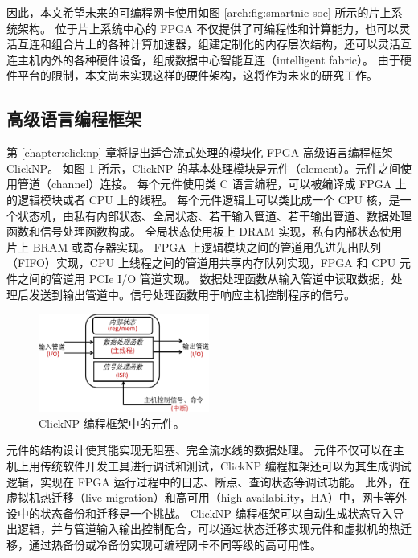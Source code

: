因此，本文希望未来的可编程网卡使用如图 \ref{arch:fig:smartnic-soc} 所示的片上系统架构。
位于片上系统中心的 FPGA 不仅提供了可编程性和计算能力，也可以灵活互连和组合片上的各种计算加速器，组建定制化的内存层次结构，还可以灵活互连主机内外的各种硬件设备，组成数据中心智能互连（intelligent fabric）。
由于硬件平台的限制，本文尚未实现这样的硬件架构，这将作为未来的研究工作。



\subsection{高级语言编程框架}

第 \ref{chapter:clicknp} 章将提出适合流式处理的模块化 FPGA 高级语言编程框架 ClickNP。
如图 \ref{arch:fig:element_arch} 所示，ClickNP 的基本处理模块是元件（element）。元件之间使用管道（channel）连接。
每个元件使用类 C 语言编程，可以被编译成 FPGA 上的逻辑模块或者 CPU 上的线程。
每个元件逻辑上可以类比成一个 CPU 核，是一个状态机，由私有内部状态、全局状态、若干输入管道、若干输出管道、数据处理函数和信号处理函数构成。
全局状态使用板上 DRAM 实现，私有内部状态使用片上 BRAM 或寄存器实现。
FPGA 上逻辑模块之间的管道用先进先出队列（FIFO）实现，CPU 上线程之间的管道用共享内存队列实现，FPGA 和 CPU 元件之间的管道用 PCIe I/O 管道实现。
数据处理函数从输入管道中读取数据，处理后发送到输出管道中。信号处理函数用于响应主机控制程序的信号。

\begin{figure}[htbp]
	\centering
	\includegraphics[width=0.5\textwidth]{chapters/clicknp/image/element_arch.pdf}
	\caption{ClickNP 编程框架中的元件。}
	\label{arch:fig:element_arch}
\end{figure}

元件的结构设计使其能实现无阻塞、完全流水线的数据处理。
元件不仅可以在主机上用传统软件开发工具进行调试和测试，ClickNP 编程框架还可以为其生成调试逻辑，实现在 FPGA 运行过程中的日志、断点、查询状态等调试功能。
此外，在虚拟机热迁移（live migration）和高可用（high availability，HA）中，网卡等外设中的状态备份和迁移是一个挑战。
ClickNP 编程框架可以自动生成状态导入导出逻辑，并与管道输入输出控制配合，可以通过状态迁移实现元件和虚拟机的热迁移，通过热备份或冷备份实现可编程网卡不同等级的高可用性。

